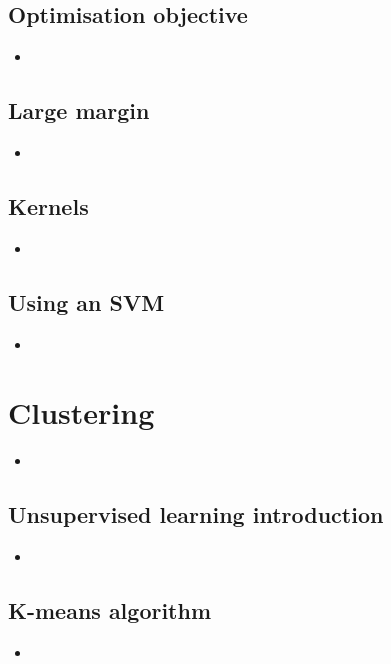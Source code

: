 \documentclass[13pt]{book}
\begin{document}
\section{Optimisation objective}
\begin{itemize}
  \item
\end{itemize}

\section{Large margin}
\begin{itemize}
  \item
\end{itemize}

\section{Kernels}
\begin{itemize}
  \item
\end{itemize}

\section{Using an SVM}
\begin{itemize}
  \item
\end{itemize}

\chapter{Clustering}
\begin{itemize}
  \item
\end{itemize}

\section{Unsupervised learning introduction}
\begin{itemize}
  \item
\end{itemize}

\section{K-means algorithm}
\begin{itemize}
  \item
\end{itemize}
\end{document}
